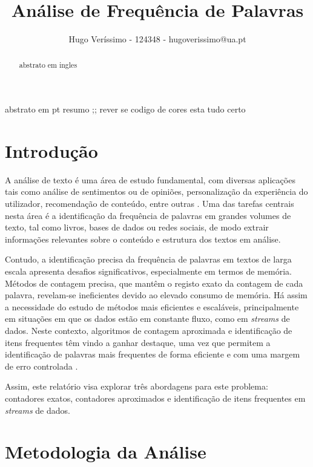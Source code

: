 \documentclass[mirror, portugues]{revdetua}
\begin{document}

\title{Análise de Frequência de Palavras}
\author{Hugo Veríssimo - 124348 - hugoverissimo@ua.pt}
\maketitle

\begin{abstract}
abstrato em ingles
\end{abstract}

\begin{resumo}
abstrato em pt resumo ;; rever se codigo de cores esta tudo certo
\end{resumo}


\section{Introdução}

A análise de texto é uma área de estudo fundamental, com diversas aplicações tais como análise de sentimentos ou de opiniões, personalização da experiência do utilizador, recomendação de conteúdo, entre outras \cite{AZ24}. Uma das tarefas centrais nesta área é a identificação da frequência de palavras em grandes volumes de texto, tal como livros, bases de dados ou redes sociais, de modo extrair informações relevantes sobre o conteúdo e estrutura dos textos em análise.

Contudo, a identificação precisa da frequência de palavras em textos de larga escala apresenta desafios significativos, especialmente em termos de memória. Métodos de contagem precisa, que mantêm o registo exato da contagem de cada palavra, revelam-se ineficientes devido ao elevado consumo de memória. Há assim a necessidade do estudo de métodos mais eficientes e escaláveis, principalmente em situações em que os dados estão em constante fluxo, como em \textit{streams} de dados. Neste contexto, algoritmos de contagem aproximada e identificação de itens frequentes têm vindo a ganhar destaque, uma vez que permitem a identificação de palavras mais frequentes de forma eficiente e com uma margem de erro controlada \cite{LH06}.

Assim, este relatório visa explorar três abordagens para este problema: contadores exatos, contadores aproximados e identificação de itens frequentes em \textit{streams} de dados.

\section{Metodologia da Análise}
\end{document}
